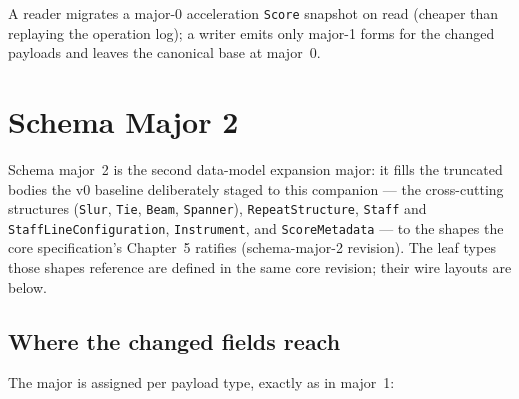 \documentclass[11pt,letterpaper]{report}
\begin{document}
A reader migrates a major-0 acceleration \texttt{Score} snapshot on read
(cheaper than replaying the operation log); a writer emits only major-1 forms
for the changed payloads and leaves the canonical base at major~0.

\section{Schema Major 2}
\label{sec:evolution:major2}

Schema major~2 is the second data-model expansion major: it fills the
truncated bodies the v0 baseline deliberately staged to this companion ---
the cross-cutting structures (\texttt{Slur}, \texttt{Tie}, \texttt{Beam},
\texttt{Spanner}), \texttt{RepeatStructure}, \texttt{Staff} and
\texttt{StaffLineConfiguration}, \texttt{Instrument}, and
\texttt{ScoreMetadata} --- to the shapes the core specification's Chapter~5
ratifies (schema-major-2 revision). The leaf types those shapes reference
are defined in the same core revision; their wire layouts are below.

\subsection{Where the changed fields reach}
The major is assigned per payload type, exactly as in major~1:
\end{document}
